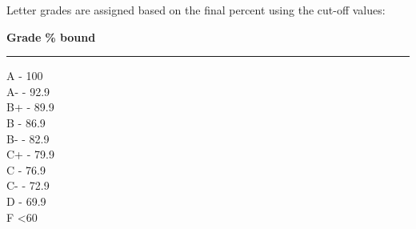 
Letter grades are assigned based on the final percent using the cut-off values:

\begin{flushleft}
	\textbf{Grade} 		\hfill 		\textbf{\% bound} \\
	\vspace{.1in} \hrule  \vspace{.1in}
	
		A 		 - 100 \\
		A- 		 - 92.9 \\
		B+ 		 - 89.9 \\
		B 		 - 86.9 \\
		B- 		 - 82.9 \\
		C+ 		 - 79.9 \\
		C 		 - 76.9 \\
		C- 		 - 72.9 \\
		D 		 - 69.9 \\
		F 		\dotfill 			<60 \\
\end{flushleft}
